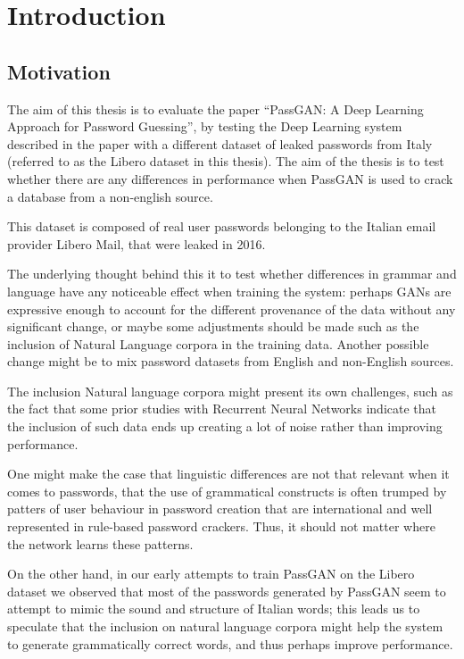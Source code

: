 \section{Introduction}\label{sec:introduction}
\subsection{Motivation}
The aim of this thesis is to evaluate the paper \enquote{PassGAN: A Deep Learning Approach for Password Guessing}\cite{PassGAN}, by testing the Deep Learning system described in the paper with a different dataset of leaked passwords from Italy\cite{libero_leak} (referred to as the Libero dataset in this thesis). The aim of the thesis is to test whether there are any differences in performance when PassGAN is used to crack a database from a non-english source.

This dataset is composed of real user passwords belonging to the Italian email provider Libero Mail, that were leaked in 2016. 

The underlying thought behind this it to test whether differences in grammar and language have any noticeable effect when training the system: perhaps GANs are expressive enough to account for the different provenance of the data without any significant change, or maybe some adjustments should be made such as the inclusion of Natural Language corpora in the training data. Another possible change might be to mix password datasets from English and non-English sources.

The inclusion Natural language corpora might present its own challenges, such as the fact that some prior studies with Recurrent Neural Networks indicate that the inclusion of such data ends up creating a lot of noise rather than improving performance\cite{Melicher2016}.

One might make the case that linguistic differences are not that relevant when it comes to passwords, that the use of grammatical constructs is often trumped by patters of user behaviour in password creation that are international and well represented in rule-based password crackers. Thus, it should not matter where the network learns these patterns.

On the other hand, in our early attempts to train PassGAN on the Libero dataset we observed that most of the passwords generated by PassGAN seem to attempt to mimic the sound and structure of Italian words; this leads us to speculate that the inclusion on natural language corpora might help the system to generate grammatically correct words, and thus perhaps improve performance.


